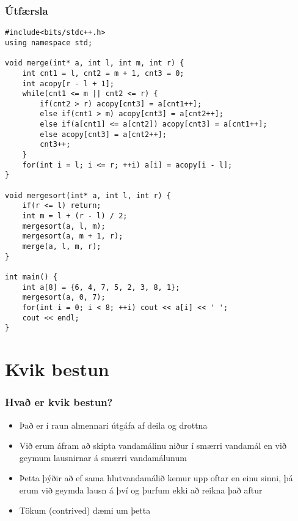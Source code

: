 \documentclass{beamer}
\begin{document}
\begin{frame}[fragile]
\frametitle{Útfærsla}

\begin{tiny}
\begin{verbatim}
#include<bits/stdc++.h>
using namespace std;

void merge(int* a, int l, int m, int r) {
    int cnt1 = l, cnt2 = m + 1, cnt3 = 0;
    int acopy[r - l + 1];
    while(cnt1 <= m || cnt2 <= r) {
        if(cnt2 > r) acopy[cnt3] = a[cnt1++];
        else if(cnt1 > m) acopy[cnt3] = a[cnt2++];
        else if(a[cnt1] <= a[cnt2]) acopy[cnt3] = a[cnt1++];
        else acopy[cnt3] = a[cnt2++];
        cnt3++;
    }
    for(int i = l; i <= r; ++i) a[i] = acopy[i - l];
}

void mergesort(int* a, int l, int r) {
	if(r <= l) return;
	int m = l + (r - l) / 2;
	mergesort(a, l, m);
	mergesort(a, m + 1, r);
	merge(a, l, m, r);
}

int main() {
	int a[8] = {6, 4, 7, 5, 2, 3, 8, 1};
	mergesort(a, 0, 7);
	for(int i = 0; i < 8; ++i) cout << a[i] << ' ';
	cout << endl;
}
\end{verbatim}
\end{tiny}

\end{frame}

\section[Kvik bestun]{Kvik bestun}

\begin{frame}
\frametitle{Hvað er kvik bestun?}

\begin{itemize}

\item<1-> Það er í raun almennari útgáfa af deila og drottna

\item<2-> Við erum áfram að skipta vandamálinu niður í smærri vandamál en við geymum lausnirnar á smærri vandamálunum

\item<3-> Þetta þýðir að ef sama hlutvandamálið kemur upp oftar en einu sinni, þá erum við geymda lausn á því og þurfum ekki að reikna það aftur

\item<4-> Tökum (contrived) dæmi um þetta

\end{itemize}

\end{frame}
\end{document}
